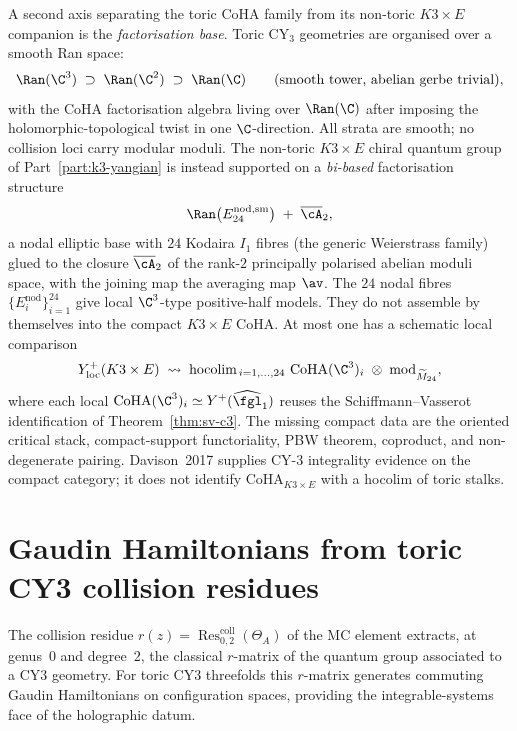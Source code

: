 \begin{remark}
\label{rem:tcy3-coha-conifold}
A second axis separating the toric CoHA family from its non-toric $K3 \times E$ companion is the \emph{factorisation base}. Toric CY$_3$ geometries are organised over a smooth Ran space:
\[
 \Ran(\C^3) \;\supset\; \Ran(\C^2) \;\supset\; \Ran(\C)
 \qquad\text{(smooth tower, abelian gerbe trivial)},
\]
with the CoHA factorisation algebra living over $\Ran(\C)$ after imposing the holomorphic-topological twist in one $\C$-direction. All strata are smooth; no collision loci carry modular moduli. The non-toric $K3 \times E$ chiral quantum group of Part~\ref{part:k3-yangian} is instead supported on a \emph{bi-based} factorisation structure
\[
 \Ran\bigl(E^{\mathrm{nod,sm}}_{24}\bigr) \;+\; \overline{\cA}_2,
\]
a nodal elliptic base with $24$ Kodaira $I_1$ fibres (the generic
Weierstrass family) glued to the closure $\overline{\cA}_2$ of the
rank-$2$ principally polarised abelian moduli space, with the joining
map the averaging map $\av$. The $24$ nodal fibres
$\{E^{\mathrm{nod}}_i\}_{i=1}^{24}$ give local $\C^3$-type positive-half
models. They do not assemble by themselves into the compact
$K3\times E$ CoHA. At most one has a schematic local comparison
\[
 Y^+_{\mathrm{loc}}(K3 \times E)
 \;\rightsquigarrow\;
 \operatorname{hocolim}_{\,i = 1, \ldots, 24}\,
 \mathrm{CoHA}(\C^3)_i
 \;\otimes\;
 \mathrm{mod}_{\widetilde{M}_{24}},
\]
where each local $\mathrm{CoHA}(\C^3)_i \simeq
Y^+(\widehat{\fgl}_1)$ reuses the Schiffmann--Vasserot identification of
Theorem~\ref{thm:sv-c3}. The missing compact data are the oriented
critical stack, compact-support functoriality, PBW theorem, coproduct,
and non-degenerate pairing. Davison~2017 supplies CY-$3$ integrality
evidence on the compact category; it does not identify
$\mathrm{CoHA}_{K3\times E}$ with a hocolim of toric stalks.
\end{remark}

\section{Gaudin Hamiltonians from toric CY3 collision residues}
\label{sec:toric-cy3-gaudin}

The collision residue $r(z) = \operatorname{Res}^{\mathrm{coll}}_{0,2}(\Theta_A)$
of the MC element extracts, at genus~$0$ and degree~$2$, the classical
$r$-matrix of the quantum group associated to a CY3 geometry.
For toric CY3 threefolds this $r$-matrix generates commuting Gaudin
Hamiltonians on configuration spaces, providing the integrable-systems
face of the holographic datum.

